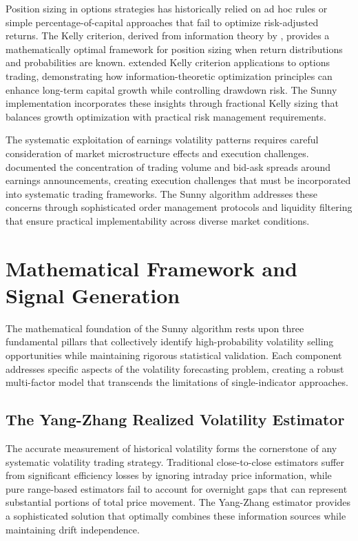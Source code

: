 \documentclass[
  american,
  11pt,
  11pt,
  letterpaper,
  onecolumn]{article}
\begin{document}
Position sizing in options strategies has historically relied on ad hoc
rules or simple percentage-of-capital approaches that fail to optimize
risk-adjusted returns. The Kelly criterion, derived from information
theory by \textcite{kelly1956}, provides a mathematically optimal
framework for position sizing when return distributions and
probabilities are known. \textcite{maclean2010} extended Kelly criterion
applications to options trading, demonstrating how information-theoretic
optimization principles can enhance long-term capital growth while
controlling drawdown risk. The Sunny implementation incorporates these
insights through fractional Kelly sizing that balances growth
optimization with practical risk management requirements.

The systematic exploitation of earnings volatility patterns requires
careful consideration of market microstructure effects and execution
challenges. \textcite{chordia2002} documented the concentration of
trading volume and bid-ask spreads around earnings announcements,
creating execution challenges that must be incorporated into systematic
trading frameworks. The Sunny algorithm addresses these concerns through
sophisticated order management protocols and liquidity filtering that
ensure practical implementability across diverse market conditions.

\section{Mathematical Framework and Signal
Generation}\label{mathematical-framework-and-signal-generation}

The mathematical foundation of the Sunny algorithm rests upon three
fundamental pillars that collectively identify high-probability
volatility selling opportunities while maintaining rigorous statistical
validation. Each component addresses specific aspects of the volatility
forecasting problem, creating a robust multi-factor model that
transcends the limitations of single-indicator approaches.

\subsection{The Yang-Zhang Realized Volatility
Estimator}\label{the-yang-zhang-realized-volatility-estimator}

The accurate measurement of historical volatility forms the cornerstone
of any systematic volatility trading strategy. Traditional
close-to-close estimators suffer from significant efficiency losses by
ignoring intraday price information, while pure range-based estimators
fail to account for overnight gaps that can represent substantial
portions of total price movement. The Yang-Zhang estimator provides a
sophisticated solution that optimally combines these information sources
while maintaining drift independence.
\end{document}
